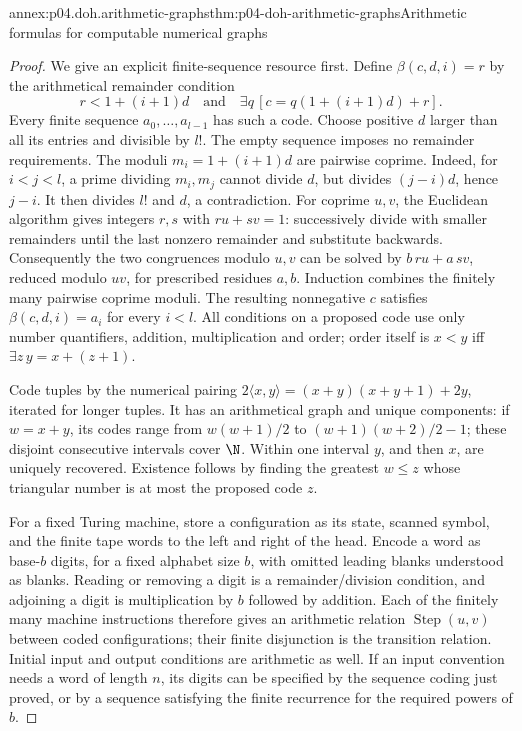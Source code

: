 \begin{annexitem}{annex:p04.doh.arithmetic-graphs}{thm:p04-doh-arithmetic-graphs}{Arithmetic formulas for computable numerical graphs}
\begin{proof}
We give an explicit finite-sequence resource first. Define
\(\beta(c,d,i)=r\) by the arithmetical remainder condition
\[
 r<1+(i+1)d\quad\text{and}\quad
 \exists q\,[c=q(1+(i+1)d)+r].
\]
Every finite sequence \(a_0,\ldots,a_{l-1}\) has such a code.
Choose positive \(d\) larger than all its entries and divisible by \(l!\).
The empty sequence imposes no remainder requirements. The moduli
\(m_i=1+(i+1)d\) are pairwise coprime. Indeed, for \(i<j<l\), a prime
dividing \(m_i,m_j\) cannot divide \(d\), but divides
\((j-i)d\), hence \(j-i\). It then divides \(l!\) and \(d\),
a contradiction. For coprime \(u,v\), the Euclidean algorithm gives
integers \(r,s\) with \(ru+sv=1\): successively divide with smaller
remainders until the last nonzero remainder and substitute backwards.
Consequently the two congruences modulo \(u,v\) can be solved by
\(b\,ru+a\,sv\), reduced modulo \(uv\), for prescribed residues
\(a,b\). Induction combines the finitely many pairwise coprime moduli.
The resulting nonnegative \(c\) satisfies \(\beta(c,d,i)=a_i\)
for every \(i<l\). All conditions on a proposed code use only
number quantifiers, addition, multiplication and order; order itself is
\(x<y\) iff \(\exists z\,y=x+(z+1)\).

Code tuples by the numerical pairing
\(2\langle x,y\rangle=(x+y)(x+y+1)+2y\), iterated for longer tuples.
It has an arithmetical graph and unique components: if
\(w=x+y\), its codes range from \(w(w+1)/2\) to
\((w+1)(w+2)/2-1\); these disjoint consecutive intervals cover
\(\N\). Within one interval \(y\), and then \(x\),
are uniquely recovered. Existence follows by finding the greatest
\(w\leq z\) whose triangular number is at most the proposed code \(z\).

For a fixed Turing machine, store a configuration as its state, scanned
symbol, and the finite tape words to the left and right of the head.
Encode a word as base-\(b\) digits, for a fixed alphabet size \(b\),
with omitted leading blanks understood as blanks. Reading or removing
a digit is a remainder/division condition, and adjoining a digit is
multiplication by \(b\) followed by addition. Each of the finitely
many machine instructions therefore gives an arithmetic relation
\(\operatorname{Step}(u,v)\) between coded configurations; their
finite disjunction is the transition relation. Initial input and output
conditions are arithmetic as well. If an input convention needs a word
of length \(n\), its digits can be specified by the sequence coding
just proved, or by a sequence satisfying the finite recurrence for the
required powers of \(b\).


\end{proof}
\end{annexitem}
